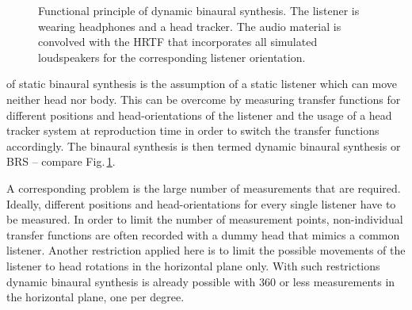 \begin{figure}
    \centering
    \small
    \caption{Functional principle of dynamic binaural synthesis. The listener is
    wearing headphones and a head tracker. The audio material is convolved with
    the \ac{HRTF} that incorporates all simulated loudspeakers for the
    corresponding listener orientation.
    }
    \label{fig:dynamic_binaural_synthesis}
\end{figure}


 of static binaural synthesis is the assumption of a static
listener which can move neither head nor body. This can be overcome by measuring
transfer functions for different positions and head-orientations of the listener
and the usage of a head tracker system at reproduction time in order to switch
the transfer functions accordingly. The binaural synthesis is then termed dynamic
binaural synthesis or \ac{BRS}\autocite{Horbach1999a} -- compare
Fig.\,\ref{fig:dynamic_binaural_synthesis}.

A corresponding problem is the large number of measurements that are required.
Ideally, different positions and head-orientations for every single listener have to be
measured. In order to limit the number of measurement points,
non-individual transfer functions are often recorded with a dummy head that
mimics a common listener. Another restriction applied here is to limit the possible movements
of the listener
to head rotations in the horizontal plane only.
With such restrictions dynamic binaural synthesis is
already possible with 360 or less measurements in the horizontal plane, one per
degree.


